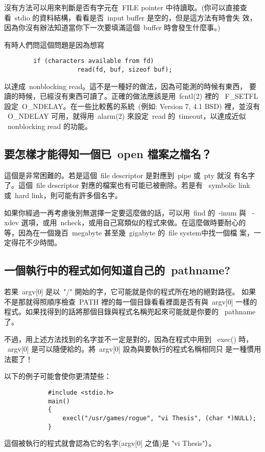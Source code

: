 \documentclass{article}
\begin{document}
\begin{CJK*}{Bg5}{ming}
	沒有方法可以用來判斷是否有字元在~FILE pointer 中待讀取。(你可以直接查
	看~stdio 的資料結構，看看是否~input buffer 是空的，但是這方法有時會失
        效，因為你沒有辦法知道當你下一次要填滿這個~buffer 時會發生什麼事。)

	有時人們問這個問題是因為想寫
\begin{verbatim}
		if (characters available from fd)
                    read(fd, buf, sizeof buf);
\end{verbatim}
	以達成~nonblocking read。這不是一種好的做法，因為可能測的時候有東西，
        要讀的時候，已經沒有東西可讀了。正確的做法應該是用~fcntl(2) 裡的 
       ~F\_SETFL 設定~O\_NDELAY。在一些比較舊的系統~(例如: Version 7, 4.1 BSD)
	裡，並沒有 ~O\_NDELAY 可用，就得用~alarm(2) 來設定~read 的~timeout，以達成近似 
       ~nonblocking read 的功能。

\subsection{要怎樣才能得知一個已~open 檔案之檔名？}

	這個是非常困難的。若是這個~file descriptor 是對應到~pipe 或~pty 就沒
        有名字了。這個~file descriptor 對應的檔案也有可能已被刪除。若是有 
        ~symbolic link 或~hard link，則可能有許多個名字。
 
	如果你經過一再考慮後別無選擇一定要這麼做的話，可以用~find 的~-inum 與 
	~-xdev 選項，或用~ncheck，或用自己寫類似的程式來做。在這麼做時要耐心的
	等，因為在一個幾百~megabyte 甚至幾~gigabyte 的~file system中找一個檔
        案，一定得花不少時間。

\subsection{一個執行中的程式如何知道自己的~pathname?}

	若果~argv[0] 是以~"/" 開始的字，它可能就是你的程式所在地的絕對路徑。
        如果不是那就得照順序檢查~PATH 裡的每一個目錄看看裡面是否有與~argv[0]
        一樣的程式。如果找得到的話將那個目錄與程式名稱兜起來可能就是你要的
	~pathname 了。

	不過，用上述方法找到的名字並不一定是對的，因為在程式中用到
	~exec() 時， 
        ~argv[0] 是可以隨便給的。將~argv[0] 設為與要執行的程式名稱相同只
	是一種慣用法罷了！

	以下的例子可能會使你更清楚些：
\small
\begin{verbatim} 
	        #include <stdio.h>
        	main()
	        {
        	    execl("/usr/games/rogue", "vi Thesis", (char *)NULL);
	        }
\end{verbatim} 
\normalsize
	這個被執行的程式就會認為它的名字(argv[0] 之值)是 "vi Thesis"）。


\end{CJK*}
\end{document}
